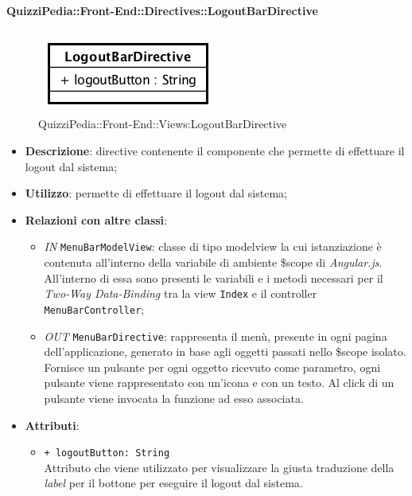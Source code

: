 \paragraph{QuizziPedia::Front-End::Directives::LogoutBarDirective}
\begin{figure} [ht]
	\centering
	\includegraphics[scale=0.80]{UML/Classi/Front-End/QuizziPedia_Front-end_Directives_LogoutBarDirective.png}
	\caption{QuizziPedia::Front-End::Views:LogoutBarDirective}
\end{figure} \FloatBarrier
\begin{itemize}
	\item \textbf{Descrizione}: directive contenente il componente che permette di effettuare il logout dal sistema;
	\item \textbf{Utilizzo}: permette di effettuare il logout dal sistema;
	\item \textbf{Relazioni con altre classi}:
	\begin{itemize}
		\item \textit{IN} \texttt{MenuBarModelView}: classe di tipo modelview la cui istanziazione è contenuta all'interno della variabile di ambiente \$scope di \textit{Angular.js}. All'interno di essa sono presenti le variabili e i metodi necessari per il \textit{Two-Way Data-Binding} tra la view \texttt{Index} e il controller \texttt{MenuBarController};
		\item \textit{OUT} \texttt{MenuBarDirective}: rappresenta il menù, presente in ogni pagina dell'applicazione, generato in base agli oggetti passati nello \$scope isolato. Fornisce un pulsante per ogni oggetto ricevuto come parametro, ogni pulsante viene rappresentato con un’icona e con un testo. Al click di un pulsante viene invocata la funzione ad esso associata.  
	\end{itemize}
	\item \textbf{Attributi}:
	\begin{itemize}
		\item \texttt{+ logoutButton: String} \\ Attributo che viene utilizzato per visualizzare la giusta traduzione della \textit{label} per il bottone per eseguire il logout dal sistema.
	\end{itemize}
\end{itemize}